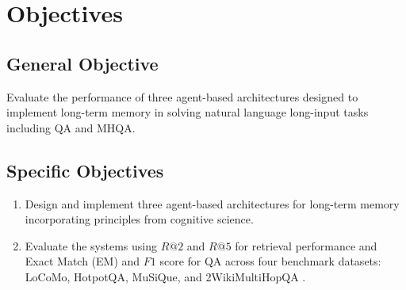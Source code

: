 \section{Objectives}
\label{sec:objectives}

\subsection{General Objective}
Evaluate the performance of three agent-based architectures designed to implement long-term memory in solving natural language long-input tasks including QA and MHQA.

\subsection{Specific Objectives}

\begin{enumerate}
    \item Design and implement three agent-based architectures for long-term memory incorporating principles from cognitive science.
    \item Evaluate the systems using $R@2$ and $R@5$ for retrieval performance and Exact Match (EM) and $F1$ score for QA across four benchmark datasets: LoCoMo, HotpotQA, MuSiQue, and 2WikiMultiHopQA \cite{maharana-etal-2024-evaluating}\cite{yang2018hotpotqa}\cite{trivedi2021musique}\cite{ho-etal-2020-constructing}.
\end{enumerate}